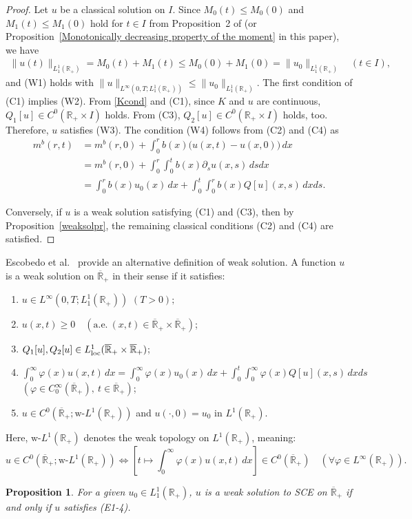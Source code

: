 \documentclass[a4paper,11pt]{article}
\newtheorem{prop}[thm]{Proposition}
\def\R{{\mathbb R}}
\def\Rp{{\mathbb R}_+}
\def\Rb{\overline{{\mathbb R}}_+}
\begin{document}
\begin{proof}
Let $u$ be a classical solution on $I$.
Since $M_0(t)\le M_0(0)$ and $M_1(t)\le M_1(0)$ hold for $t\in I$ from Proposition~2 of \cite{I-K-M2023} (or Proposition~\ref{Monotonically decreasing property of the moment} in this paper),
we have
\begin{align*}
  \|u(t)\|_{L^1_1(\R_+)}=M_0(t)+M_1(t)\le M_0(0)+M_1(0)= \|u_0\|_{L^1_1(\R_+)}\quad (t\in I),
\end{align*}
and (W1) holds with $\|u\|_{L^\infty(0,T;L^1_1(\R_+))}\le \|u_0\|_{L^1_1(\R_+)}$.
The first condition of (C1) implies (W2). From \eqref{Kcond} and (C1), since $K$ and $u$ are continuous,
$Q_1[u]\in C^0(\R_+\times I)$ holds. From (C3), $Q_2[u]\in C^0(\R_+\times I)$ holds, too.
Therefore, $u$ satisfies (W3). The condition (W4) follows from (C2) and (C4) as
\begin{align*}
  m^b(r,t) &= m^b(r,0)+\int_{0}^{r}b(x)\big(u(x,t)-u(x,0)\big)\,dx\\
  &= m^b(r,0)+\int_{0}^{r}\int_{0}^{t}b(x)\partial_s u(x,s)\,dsdx\\
  &= \int_{0}^{r}b(x)u_0(x)\,dx+\int_{0}^{t}\int_{0}^{r}b(x)Q[u](x,s)\,dxds.
\end{align*}

Conversely, if $u$ is a weak solution satisfying (C1) and (C3), then by Proposition~\ref{weaksolpr}, the remaining classical conditions (C2) and (C4) are satisfied.
\end{proof}

Escobedo et al.~\cite{E-L-M-P2003} provide an alternative definition of weak solution. A function $u$ is a weak solution on $\Rb$ in their sense if it satisfies:
\begin{enumerate}[(E1)]
\item $u\in L^\infty(0,T;L^1_1(\Rp))$ $(T>0);$\label{E1}
\item $u(x,t)\geq 0\quad (\text{a.e.}~ (x,t)\in \Rb\times \Rb)$;\label{E2}
\item $Q_1[u],Q_2[u]\in L^1_{\rm loc}(\Rb\times \Rb)$;\label{E3}
\item \label{E4}
$\displaystyle\int_{0}^{\infty}\varphi(x)u(x,t)\,dx=\int_{0}^{\infty}\varphi(x)u_0(x)\,dx+\int_{0}^{t}\int_{0}^{\infty}\varphi(x)Q[u](x,s)\,dxds$\\
$(\varphi\in C_0^\infty(\Rb),~t\in\Rb)$;
\item $u\in C^0 (\Rb;\mbox{w-}L^1(\Rp))$ and $u(\cdot,0)=u_0$ in $L^1(\Rp)$.
\end{enumerate}
Here, $\mathrm{w\text{-}}L^1(\Rp)$ denotes the weak topology on $L^1(\Rp)$, meaning:
\[
u \in C^0(\Rb; \mathrm{w\text{-}}L^1(\Rp)) \iff \left[t \mapsto \int_0^\infty \varphi(x)u(x,t)\,dx\right] \in C^0(\Rb) \quad (\forall \varphi \in L^\infty(\Rp)).
\]
\begin{prop}\label{wsprop}
For a given $u_0\in L^1_1(\Rp)$,
$u$ is a weak solution to SCE on $\Rb$ if and only if $u$ satisfies {\rm (E1-4)}.
\end{prop}
\end{document}
